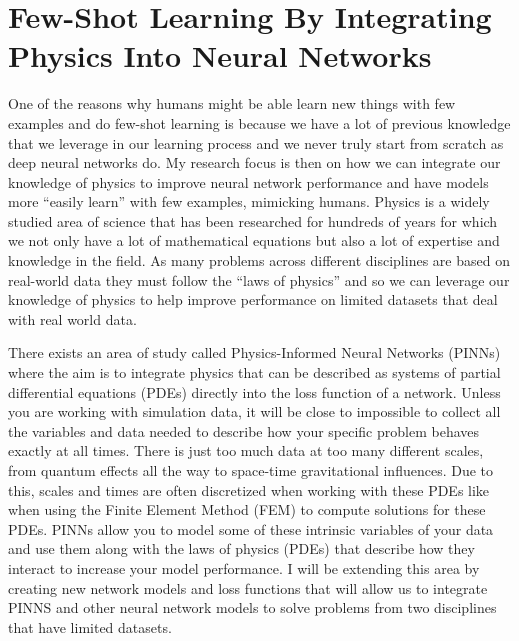 \section{Few-Shot Learning By Integrating Physics Into Neural Networks}
\label{Few-Shot Introduction}
One of the reasons why humans might be able learn new things with few examples and do few-shot learning is because we have a lot of previous knowledge that we leverage in our learning process and we never truly start from scratch as deep neural networks do. My research focus is then on how we can integrate our knowledge of physics to improve neural network performance and have models more ``easily learn'' with few examples, mimicking humans. Physics is a widely studied area of science that has been researched for hundreds of years for which we not only have a lot of mathematical equations but also a lot of expertise and knowledge in the field. As many problems across different disciplines are based on real-world data they must follow the ``laws of physics'' and so we can leverage our knowledge of physics to help improve performance on limited datasets that deal with real world data. 


There exists an area of study called Physics-Informed Neural Networks (PINNs) \cite{PINNS} where the aim is to integrate physics that can be described as systems of partial differential equations (PDEs) directly into the loss function of a network. Unless you are working with simulation data, it will be close to impossible to collect all the variables and data needed to describe how your specific problem behaves exactly at all times. There is just too much data at too many different scales, from quantum effects all the way to space-time gravitational influences. Due to this, scales and times are often discretized when working with these PDEs like when using the Finite Element Method (FEM) to compute solutions for these PDEs. PINNs allow you to model some of these intrinsic variables of your data and use them along with the laws of physics (PDEs) that describe how they interact to increase your model performance. I will be extending this area by creating new network models and loss functions that will allow us to integrate PINNS and other neural network models to solve problems from two disciplines that have limited datasets.

